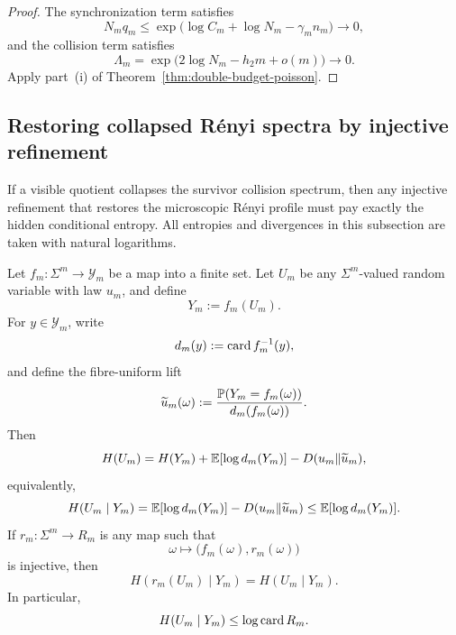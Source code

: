 \begin{proof}
The synchronization term satisfies
\[
  N_m q_m
  \leq \exp\bigl(\log C_m+\log N_m-\gamma_m n_m\bigr)
  \longrightarrow 0,
\]
and the collision term satisfies
\[
  \Lambda_m
  = \exp\bigl(2\log N_m-h_2m+o(m)\bigr)
  \longrightarrow 0.
\]
Apply part~(i) of Theorem~\ref{thm:double-budget-poisson}.
\end{proof}

\subsection{Restoring collapsed R\'enyi spectra by injective refinement}

If a visible quotient collapses the survivor collision spectrum, then any
injective refinement that restores the microscopic R\'enyi profile must
pay exactly the hidden conditional entropy.  All entropies and
divergences in this subsection are taken with natural logarithms.

\begin{theorem}
\label{thm:entropy-ledger}
Let \(f_m:\Sigma^m\to \mathcal{Y}_m\) be a map into a finite set.  Let \(U_m\) be
any \(\Sigma^m\)-valued random variable with law \(u_m\), and define
\[
  Y_m:=f_m(U_m).
\]
For \(y\in \mathcal{Y}_m\), write
\[
  d_m(y):=\operatorname{card}{f_m^{-1}(y)},
\]
and define the fibre-uniform lift
\[
  \widetilde u_m(\omega)
  := \frac{\mathbb{P}(Y_m=f_m(\omega))}
           {d_m(f_m(\omega))}.
\]
Then
\[
  H(U_m)
  = H(Y_m)+\mathbb{E}[\log d_m(Y_m)]-D(u_m\Vert \widetilde u_m),
\]
equivalently,
\[
  H(U_m\mid Y_m)
  = \mathbb{E}[\log d_m(Y_m)]-D(u_m\Vert \widetilde u_m)
  \leq \mathbb{E}[\log d_m(Y_m)].
\]
If \(r_m:\Sigma^m\to R_m\) is any map such that
\[
  \omega\longmapsto \bigl(f_m(\omega),r_m(\omega)\bigr)
\]
is injective, then
\[
  H(r_m(U_m)\mid Y_m)=H(U_m\mid Y_m).
\]
In particular,
\[
  H(U_m\mid Y_m)\leq \log\operatorname{card}{R_m}.
\]
\end{theorem}

